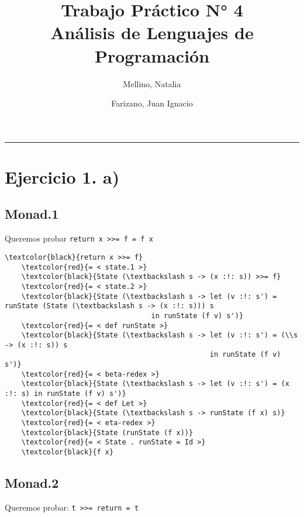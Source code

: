 \documentclass[11pt]{article}
\title{
    Trabajo Práctico N° 4 \\
    \large Análisis de Lenguajes de Programación}
\author{Mellino, Natalia \and Farizano, Juan Ignacio}
\date{}
\begin{document}
\maketitle
\noindent\rule{\textwidth}{1pt}

\section*{Ejercicio 1. a)}

\subsection*{Monad.1}

Queremos probar \texttt{return x >>= f \;\;=\;\; f x}

\begin{Verbatim}[commandchars=\\\{\}]
    \textcolor{black}{return x >>= f}
    \textcolor{red}{= < state.1 >}
    \textcolor{black}{State (\textbackslash s -> (x :!: s)) >>= f}
    \textcolor{red}{= < state.2 >}
    \textcolor{black}{State (\textbackslash s -> let (v :!: s') = runState (State (\textbackslash s -> (x :!: s))) s
                                   in runState (f v) s')}
    \textcolor{red}{= < def runState >}
    \textcolor{black}{State (\textbackslash s -> let (v :!: s') = (\\s -> (x :!: s)) s
                                                 in runState (f v) s')}
    \textcolor{red}{= < beta-redex >}
    \textcolor{black}{State (\textbackslash s -> let (v :!: s') = (x :!: s) in runState (f v) s')}
    \textcolor{red}{= < def Let >}
    \textcolor{black}{State (\textbackslash s -> runState (f x) s)}
    \textcolor{red}{= < eta-redex >}
    \textcolor{black}{State (runState (f x))}
    \textcolor{red}{= < State . runState = Id >}
    \textcolor{black}{f x}
\end{Verbatim}

\subsection*{Monad.2}

Queremos probar: \texttt{t >>= return \;\;=\;\; t}
\end{document}

